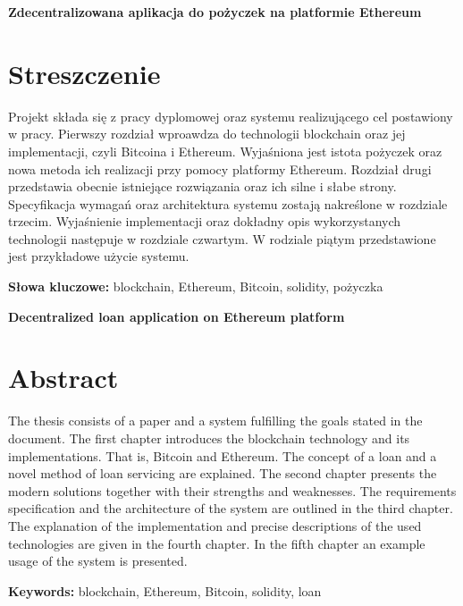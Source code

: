 \newpage
\begin{center}
\large \bf
Zdecentralizowana aplikacja do pożyczek na platformie Ethereum
\end{center}

\section*{Streszczenie}
Projekt składa się z pracy dyplomowej oraz systemu realizującego cel postawiony w pracy.
Pierwszy rozdział wproawdza do technologii blockchain oraz jej implementacji, czyli Bitcoina i Ethereum. Wyjaśniona jest istota pożyczek oraz nowa metoda ich realizacji przy pomocy platformy Ethereum. Rozdział drugi przedstawia obecnie istniejące rozwiązania oraz ich silne i słabe strony. Specyfikacja wymagań oraz architektura systemu zostają nakreślone w rozdziale trzecim. Wyjaśnienie implementacji oraz dokładny opis wykorzystanych technologii następuje w rozdziale czwartym. W rodziale piątym przedstawione jest przykładowe użycie systemu.

\bigskip
{\noindent\bf Słowa kluczowe:} blockchain, Ethereum, Bitcoin, solidity, pożyczka

\vskip 2cm


\begin{center}
\large \bf
Decentralized loan application on Ethereum platform
\end{center}

\section*{Abstract}

The thesis consists of a paper and a system fulfilling the goals stated in the document. The first chapter introduces the blockchain technology and its implementations. That is, Bitcoin and Ethereum. The concept of a loan and a novel method of loan servicing are explained. The second chapter presents the modern solutions together with their strengths and weaknesses.  The requirements specification and the architecture of the system are outlined in the third chapter. The explanation of the implementation and precise descriptions of the used technologies are given in the fourth chapter. In the fifth chapter an example usage of the system is presented.

\bigskip
{\noindent\bf Keywords:} blockchain, Ethereum, Bitcoin, solidity,  loan

\vfill
